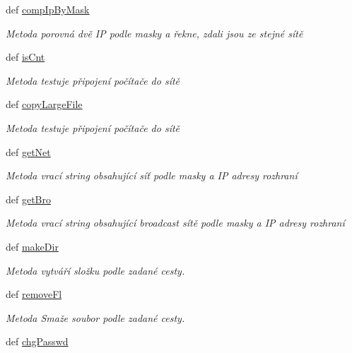 \begin{DoxyCompactItemize}
def \hyperlink{classConsSys_1_1ConsSys_a1ef224020294732e42b40e7ee5664d34}{comp\-Ip\-By\-Mask}
\begin{DoxyCompactList}\small\item\em Metoda porovná dvě I\-P podle masky a řekne, zdali jsou ze stejné sítě \end{DoxyCompactList}\item 
def \hyperlink{classConsSys_1_1ConsSys_ab9af30415a18ef366860ab040eacb8e8}{is\-Cnt}
\begin{DoxyCompactList}\small\item\em Metoda testuje připojení počítače do sítě \end{DoxyCompactList}\item 
def \hyperlink{classConsSys_1_1ConsSys_a32297a919cf09725c56828a6769cff70}{copy\-Large\-File}
\begin{DoxyCompactList}\small\item\em Metoda testuje připojení počítače do sítě \end{DoxyCompactList}\item 
def \hyperlink{classConsSys_1_1ConsSys_ac263a75aea172529aaab896910868f8b}{get\-Net}
\begin{DoxyCompactList}\small\item\em Metoda vrací string obsahující síť podle masky a I\-P adresy rozhraní \end{DoxyCompactList}\item 
def \hyperlink{classConsSys_1_1ConsSys_a93f04ba291edd339f34874dacb13fa9e}{get\-Bro}
\begin{DoxyCompactList}\small\item\em Metoda vrací string obsahující broadcast sítě podle masky a I\-P adresy rozhraní \end{DoxyCompactList}\item 
def \hyperlink{classConsSys_1_1ConsSys_a5cce3cec792a5c429af36432c8dc5110}{make\-Dir}
\begin{DoxyCompactList}\small\item\em Metoda vytváří složku podle zadané cesty. \end{DoxyCompactList}\item 
def \hyperlink{classConsSys_1_1ConsSys_ace43e4206f73305e9137e0d36d00c435}{remove\-Fl}
\begin{DoxyCompactList}\small\item\em Metoda Smaže soubor podle zadané cesty. \end{DoxyCompactList}\item 
def \hyperlink{classConsSys_1_1ConsSys_acf615435122450524b7318d58c47e783}{chg\-Passwd}

\end{DoxyCompactItemize}
